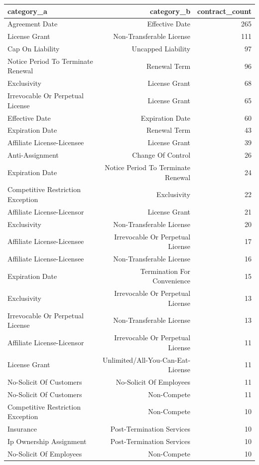 \begin{tabular}{lrr}
\toprule
category\_a & category\_b & contract\_count \\
\midrule
Agreement Date & Effective Date & 265 \\
License Grant & Non-Transferable License & 111 \\
Cap On Liability & Uncapped Liability & 97 \\
Notice Period To Terminate Renewal & Renewal Term & 96 \\
Exclusivity & License Grant & 68 \\
Irrevocable Or Perpetual License & License Grant & 65 \\
Effective Date & Expiration Date & 60 \\
Expiration Date & Renewal Term & 43 \\
Affiliate License-Licensee & License Grant & 39 \\
Anti-Assignment & Change Of Control & 26 \\
Expiration Date & Notice Period To Terminate Renewal & 24 \\
Competitive Restriction Exception & Exclusivity & 22 \\
Affiliate License-Licensor & License Grant & 21 \\
Exclusivity & Non-Transferable License & 20 \\
Affiliate License-Licensee & Irrevocable Or Perpetual License & 17 \\
Affiliate License-Licensee & Non-Transferable License & 16 \\
Expiration Date & Termination For Convenience & 15 \\
Exclusivity & Irrevocable Or Perpetual License & 13 \\
Irrevocable Or Perpetual License & Non-Transferable License & 13 \\
Affiliate License-Licensor & Irrevocable Or Perpetual License & 11 \\
License Grant & Unlimited/All-You-Can-Eat-License & 11 \\
No-Solicit Of Customers & No-Solicit Of Employees & 11 \\
No-Solicit Of Customers & Non-Compete & 11 \\
Competitive Restriction Exception & Non-Compete & 10 \\
Insurance & Post-Termination Services & 10 \\
Ip Ownership Assignment & Post-Termination Services & 10 \\
No-Solicit Of Employees & Non-Compete & 10 \\

\end{tabular}
